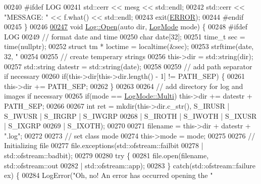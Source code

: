 \begin{DoxyCode}
00240 \textcolor{preprocessor}{#ifdef LOG}
00241         std::cerr << mesg << std::endl;
00242         std::cerr << \textcolor{stringliteral}{"MESSAGE: "} << f.what() << std::endl;
00243         exit(\hyperlink{definitions_8hpp_a8fe83ac76edc595f6b98cd4a4127aed5}{ERROR});
00244 \textcolor{preprocessor}{#endif}
00245     \}
00246 
\hypertarget{Log_8hpp_source_l00247}{}\hyperlink{classChipChipArray_1_1Log_ad27a06a4561f2f59159bd8a7fc2fed3b}{00247}     \textcolor{keywordtype}{void} \hyperlink{classChipChipArray_1_1Log_ad27a06a4561f2f59159bd8a7fc2fed3b}{Log::Open}(\textcolor{keyword}{auto} dir, \hyperlink{definitions_8hpp_aa7380b6d694cab49f07aed6a7af592d9}{LogMode} mode) \{
00248 \textcolor{preprocessor}{#ifdef LOG}
00249         \textcolor{comment}{// format date and time}
00250         \textcolor{keywordtype}{char} date[32];
00251         time\_t sec = time(\textcolor{keyword}{nullptr});
00252         \textcolor{keyword}{struct }tm * loctime = localtime(&sec);
00253         strftime(date, 32, \textcolor{stringliteral}{"%
00254 
00255         \textcolor{comment}{// create temperary strings}
00256         this->dir = std::string(dir);
00257         std::string datestr = std::string(date);
00258 
00259         \textcolor{comment}{// add path separator if necessary}
00260         \textcolor{keywordflow}{if}(this->dir[this->dir.length() - 1] != PATH\_SEP) \{
00261             this->dir += PATH\_SEP;
00262         \}
00263 
00264         \textcolor{comment}{// add directory for log and images if necessary}
00265         \textcolor{keywordflow}{if}(mode == \hyperlink{definitions_8hpp_aa7380b6d694cab49f07aed6a7af592d9ace7898536dd0e928d1640ee2ad531cc8}{LogMode::Multi}) this->dir += datestr + PATH\_SEP;
00266 
00267         \textcolor{keywordtype}{int} ret = mkdir(this->dir.c\_str(), S\_IRUSR | S\_IWUSR | S\_IRGRP | S\_IWGRP
00268                 | S\_IROTH | S\_IWOTH | S\_IXUSR | S\_IXGRP
00269                 | S\_IXOTH);
00270 
00271         filename = this->dir + datestr + \textcolor{stringliteral}{".log"};
00272 
00273         \textcolor{comment}{// set class mode}
00274         this->mode = mode;
00275 
00276         \textcolor{comment}{// Initializing file}
00277         file.exceptions(std::ofstream::failbit
00278                 | std::ofstream::badbit);
00279 
00280         \textcolor{keywordflow}{try} \{
00281             file.open(filename, std::ofstream::out
00282                     | std::ofstream::app);
00283         \} \textcolor{keywordflow}{catch}(std::ofstream::failure ex) \{
00284             LogError(\textcolor{stringliteral}{"Oh, no! An error has occurred opening the "}
}
\end{DoxyCode}
